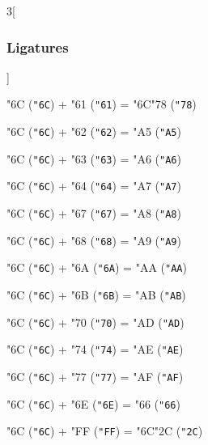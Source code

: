 \documentclass{article}
\begin{document}
\begin{multicols}{3}[\subsubsection{Ligatures}]

{\testfont\char"6C\noboundary} ({\tt"6C}) + {\testfont\char"61\noboundary} ({\tt"61}) = {\testfont\char"6C\noboundary}{\testfont\char"78\noboundary} ({\tt"78}) 

{\testfont\char"6C\noboundary} ({\tt"6C}) + {\testfont\char"62\noboundary} ({\tt"62}) = {\testfont\char"A5\noboundary} ({\tt"A5}) 

{\testfont\char"6C\noboundary} ({\tt"6C}) + {\testfont\char"63\noboundary} ({\tt"63}) = {\testfont\char"A6\noboundary} ({\tt"A6}) 

{\testfont\char"6C\noboundary} ({\tt"6C}) + {\testfont\char"64\noboundary} ({\tt"64}) = {\testfont\char"A7\noboundary} ({\tt"A7}) 

{\testfont\char"6C\noboundary} ({\tt"6C}) + {\testfont\char"67\noboundary} ({\tt"67}) = {\testfont\char"A8\noboundary} ({\tt"A8}) 

{\testfont\char"6C\noboundary} ({\tt"6C}) + {\testfont\char"68\noboundary} ({\tt"68}) = {\testfont\char"A9\noboundary} ({\tt"A9}) 

{\testfont\char"6C\noboundary} ({\tt"6C}) + {\testfont\char"6A\noboundary} ({\tt"6A}) = {\testfont\char"AA\noboundary} ({\tt"AA}) 

{\testfont\char"6C\noboundary} ({\tt"6C}) + {\testfont\char"6B\noboundary} ({\tt"6B}) = {\testfont\char"AB\noboundary} ({\tt"AB}) 

{\testfont\char"6C\noboundary} ({\tt"6C}) + {\testfont\char"70\noboundary} ({\tt"70}) = {\testfont\char"AD\noboundary} ({\tt"AD}) 

{\testfont\char"6C\noboundary} ({\tt"6C}) + {\testfont\char"74\noboundary} ({\tt"74}) = {\testfont\char"AE\noboundary} ({\tt"AE}) 

{\testfont\char"6C\noboundary} ({\tt"6C}) + {\testfont\char"77\noboundary} ({\tt"77}) = {\testfont\char"AF\noboundary} ({\tt"AF}) 

{\testfont\char"6C\noboundary} ({\tt"6C}) + {\testfont\char"6E\noboundary} ({\tt"6E}) = {\testfont\char"66\noboundary} ({\tt"66}) 

{\testfont\char"6C\noboundary} ({\tt"6C}) + {\testfont\char"FF\noboundary} ({\tt"FF}) = {\testfont\char"6C\noboundary}{\testfont\char"2C\noboundary} ({\tt"2C}) 

\end{multicols}
\end{document}
